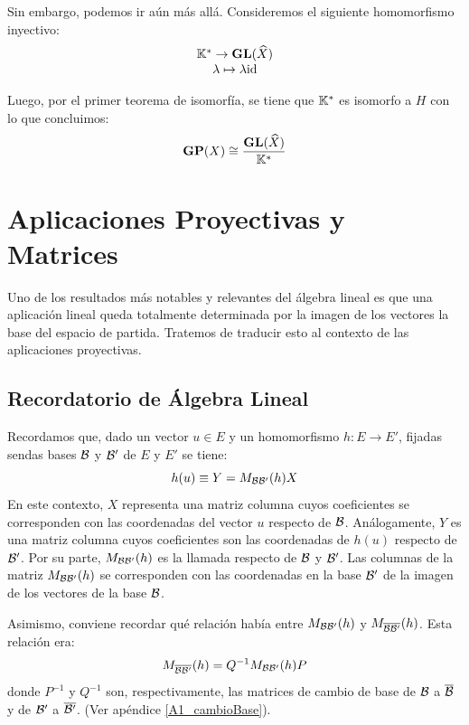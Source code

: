 Sin embargo, podemos ir aún más allá. Consideremos el siguiente homomorfismo inyectivo:
\[\begin{array}{c}
\mathbb{K}^*\to\mathbf{GL}(\widehat{X})\\
\lambda\mapsto\lambda\mathrm{id}
\end{array}\]

Luego, por el primer teorema de isomorfía, se tiene que $\mathbb{K}^*$ es isomorfo a $H$ con lo que concluimos:
\begin{equation}\mathbf{GP}(X)\cong\frac{\mathbf{GL}(\widehat{X})}{\mathbb{K}^*}\end{equation}
\section{Aplicaciones Proyectivas y Matrices}
\label{C4_matrices}
Uno de los resultados más notables y relevantes del álgebra lineal es que una aplicación lineal queda totalmente determinada por la imagen de los vectores la base del espacio de partida. Tratemos de traducir esto al contexto de las aplicaciones proyectivas.


\subsection{Recordatorio de Álgebra Lineal} 

Recordamos que, dado un vector $u\in E$ y un homomorfismo $h:E\to E'$, fijadas sendas bases $\mathcal{B}$ y $\mathcal{B}'$ de $E$ y $E'$ se tiene:
\begin{equation}
	\label{C4_eq_formulaLineales}
	h(u)\equiv Y=M_{\mathcal{B}\mathcal{B}'}(h)X
\end{equation}
En este contexto, $X$ representa una matriz columna cuyos coeficientes se corresponden con las coordenadas del vector $u$ respecto de $\mathcal{B}$. Análogamente, $Y$ es una matriz columna cuyos coeficientes son las coordenadas de $h(u)$ respecto de $\mathcal{B}'$. Por su parte, $M_{\mathcal{B}\mathcal{B}'}(h)$ es la llamada  respecto de $\mathcal{B}$ y $\mathcal{B}'$. Las columnas de la matriz $M_{\mathcal{B}\mathcal{B}'}(h)$ se corresponden con las coordenadas en la base $\mathcal{B}'$ de la imagen de los vectores de la base $\mathcal{B}$. 

Asimismo, conviene recordar qué relación había entre $M_{\mathcal{B}\mathcal{B}'}(h)$ y $M_{\overline{\mathcal{B}}\overline{\mathcal{B}'}}(h)$. Esta relación era:
\begin{equation}
\label{C4_eq_formulaLineales2}
	M_{\overline{\mathcal{B}}\overline{\mathcal{B}'}}(h)=Q^{-1}M_{\mathcal{B}\mathcal{B}'}(h)P
\end{equation}
donde $P^{-1}$ y $Q^{-1}$ son, respectivamente, las matrices de cambio de base de $\mathcal{B}$ a $\overline{\mathcal{B}}$ y de $\mathcal{B}'$ a $\overline{\mathcal{B}'}$. (Ver apéndice \ref{A1_cambioBase}).
